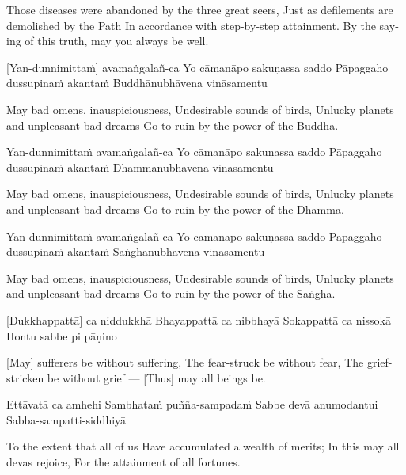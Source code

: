 \begin{english}
  Those diseases were abandoned by the three great seers,
  Just as defilements are demolished by the Path
  In accordance with step-by-step attainment.
  By the saying of this truth, may you always be well.
\end{english}

\suttaRef{[Thai]}

[Yan-dunnimittaṁ] avamaṅgalañ-ca
Yo cāmanāpo sakuṇassa saddo
Pāpaggaho dussupinaṁ akantaṁ
Buddhānubhāvena vināsamentu

\begin{english}
  May bad omens, inauspiciousness,
  Undesirable sounds of birds,
  Unlucky planets and unpleasant bad dreams
  Go to ruin by the power of the Buddha.
\end{english}

Yan-dunnimittaṁ avamaṅgalañ-ca
Yo cāmanāpo sakuṇassa saddo
Pāpaggaho dussupinaṁ akantaṁ
Dhammānubhāvena vināsamentu

\begin{english}
  May bad omens, inauspiciousness,
  Undesirable sounds of birds,
  Unlucky planets and unpleasant bad dreams
  Go to ruin by the power of the Dhamma.
\end{english}

Yan-dunnimittaṁ avamaṅgalañ-ca
Yo cāmanāpo sakuṇassa saddo
Pāpaggaho dussupinaṁ akantaṁ
Saṅghānubhāvena vināsamentu

\begin{english}
  May bad omens, inauspiciousness,
  Undesirable sounds of birds,
  Unlucky planets and unpleasant bad dreams
  Go to ruin by the power of the Saṅgha.
\end{english}

\suttaRef{[Trad]}

[Dukkhappattā] ca niddukkhā
Bhayappattā ca nibbhayā
Sokappattā ca nissokā
Hontu sabbe pi pāṇino

\begin{english}
  [May] sufferers be without suffering,
  The fear-struck be without fear,
  The grief-stricken be without grief —
  [Thus] may all beings be.
\end{english}

Ettāvatā ca amhehi
Sambhataṁ puñña-sampadaṁ
Sabbe devā anumodantui
Sabba-sampatti-siddhiyā

\begin{english}
  To the extent that all of us
  Have accumulated a wealth of merits;
  In this may all devas rejoice,
  For the attainment of all fortunes.
\end{english}

